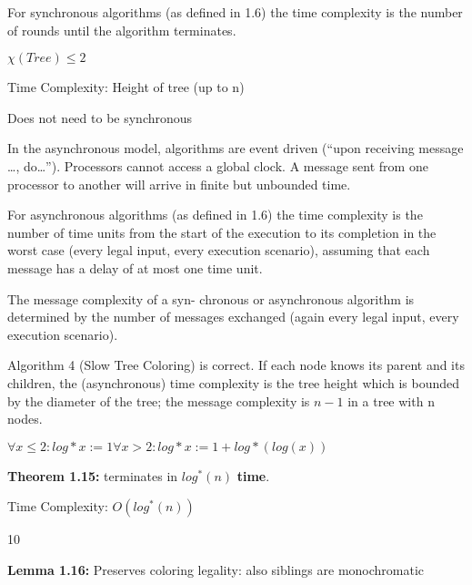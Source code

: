 {
	For synchronous algorithms (as defined in 1.6) the time complexity is the
	number of rounds until the algorithm terminates.
}

{
	$\chi (Tree) \leq 2$
}

{
	\begin{items}
		\item Time Complexity: Height of tree (up to n)
		\item Does not need to be synchronous
	\end{items}
}

{
	In the asynchronous model, algorithms are event driven (``upon receiving
	message \ldots, do\ldots''). Processors cannot access a global clock. A
	message sent from one processor to another will arrive in finite but unbounded
	time.
}

{
	For asynchronous algorithms (as defined in 1.6) the time complexity is the 
	number of time units from the start of the execution to its completion in the
	worst case (every legal input, every execution scenario), assuming that each
	message has a delay of at most one time unit. 
}

{
	The message complexity of a syn- chronous or asynchronous algorithm is
	determined by the number of messages exchanged (again every legal input, every
	execution scenario). 
}

{
	Algorithm 4 (Slow Tree Coloring) is correct. If each node knows its parent and
	its children, the (asynchronous) time complexity is the tree height which is
	bounded by the diameter of the tree; the message complexity is $n-1$ in
	a tree with n nodes.
}

{
	$\forall x \leq 2: log*x:=1 \forall x>2: log*x:=1+log*(log(x))$
}

{
	\begin{items}
		\item {\bf Theorem 1.15:} terminates in $log^{*}(n)$ {\bf time}.
		\item Time Complexity: $O(log^{*}(n))$ 
	\end{items}
}
{10}

{
	\begin{items}
		\item {\bf Lemma 1.16:} Preserves coloring legality: also siblings are
		monochromatic
	\end{items}
}

